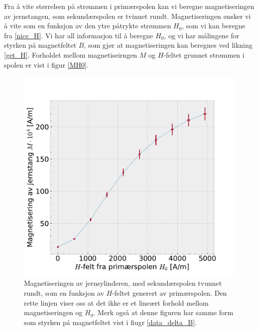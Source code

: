 \documentclass[%
 reprint,
 amsmath,amssymb,
 aps,
 norsk,
]{revtex4-1}
\begin{document}
Fra å vite størrelsen på strømmen i primærspolen kan vi beregne magnetiseringen av jernstangen, som sekundærspolen er tvinnet rundt. Magnetiseringen ønsker vi å vite som en funksjon av den ytre påtrykte strømmen $H_0$, som vi kan beregne fra \eqref{nice_H}. Vi har all informasjon til å beregne $H_0$, og vi har målingene for styrken på magnetfeltet $B$, som gjør at magnetiseringen kan beregnes ved likning \eqref{get_H}. Forholdet mellom magnetiseirngen $M$ og $H$-feltet grunnet strømmen i spolen er vist i figur \vref{MH0}.
\begin{figure}[h!]
  \centering
  \includegraphics[scale=0.45]{magnetisering.pdf}
  \caption{Magnetiseringen av jernsylinderen, med sekundærspolen tvunnet rundt, som en funksjon av $H$-feltet generert av primærspolen. Den rette linjen viser oss at det ikke er et lineært forhold mellom magnetiseringen og $H_0$. Merk også at denne figuren har samme form som styrken på magnetfeltet vist i fiugr \vref{data_delta_B}.}
  \label{MH0}
\end{figure}
\end{document}
